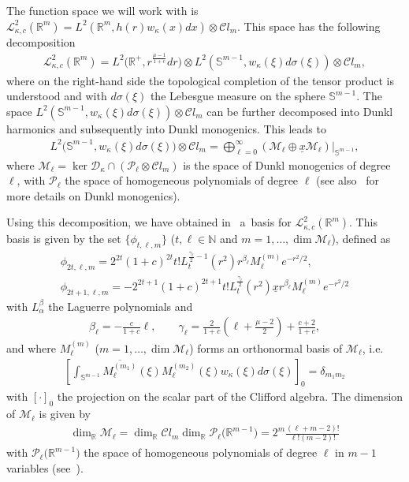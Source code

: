 \documentclass[pdftex]{sigma}
\numberwithin{equation}{section}
\numberwithin{theorem}{section}
\numberwithin{proposition}{section}
\numberwithin{lemma}{section}
\numberwithin{corollary}{section}
\numberwithin{definition}{section}
\numberwithin{example}{section}
\numberwithin{remark}{section}
\numberwithin{note}{section}
\theoremstyle{remark}
\newcommand{\mR}{\mathbb{R}}
\newcommand{\mN}{\mathbb{N}}
\newcommand{\mS}{\mathbb{S}}
\newcommand{\cD}{\mathcal{D}}
\newcommand{\cM}{\mathcal{M}}
\newcommand{\cP}{\mathcal{P}}
\newcommand{\cC}{\mathcal{C}}
\newcommand{\cL}{\mathcal{L}}
\newcommand{\ux}{\underline{x}}
\def\k{{\kappa}}
\begin{document}
The function space we will work with is $\cL^{2}_{\k,c}(\mR^{m})=L^{2}(\mR^{m},h(r)w_{\k}(x)dx)
\otimes\cC l_{m}$.
This space has the following decomposition
\begin{gather*}
\cL^{2}_{\k,c}(\mR^{m})=L^{2}\big(\mR^{+},r^{\frac{\mu-1}{1+c}}dr\big)\otimes
L^{2}(\mS^{m-1},w_{\k}(\xi)d\sigma(\xi))\otimes\cC l_{m},
\end{gather*}
where on the right-hand side the topological completion of the tensor product is understood and
with $d\sigma(\xi)$ the Lebesgue measure on the sphere $\mS^{m-1}$.
The space $L^{2}(\mS^{m-1},w_{\k}(\xi)d\sigma(\xi))\otimes\cC l_{m}$ can be further decomposed
into Dunkl harmonics and subsequently into Dunkl monogenics.
This leads to
\begin{gather*}
L^{2}\big(\mS^{m-1},w_{\k}(\xi)d\sigma(\xi)\big)\otimes\cC l_{m}=\bigoplus_{\ell=0}^{\infty}
\left(\cM_{\ell}\oplus\ux\cM_{\ell}\right)\big|_{\mS^{m-1}},
\end{gather*}
where $\cM_{\ell}=\ker{\cD_{\k}}\cap\left(\cP_{\ell}\otimes\cC l_{m}\right)$ is the space
of Dunkl monogenics of degree $\ell$, with $\cP_{\ell}$ the space of homogeneous polynomials of
degree $\ell$ (see also~\cite{DBGeg} for more details on Dunkl monogenics).

Using this decomposition, we have obtained in~\cite{H12} a~basis for $\cL^{2}_{\k,c}(\mR^{m})$.
This basis is given by the set $\{\phi_{t,\ell,m}\}$ ($t,\ell\in\mN$ and $m=1,\ldots,\dim
\cM_{\ell}$), def\/ined as
\begin{gather*}
\phi_{2t,\ell,m} = 2^{2t} (1+c)^{2t} t! L_{t}^{\frac{\gamma_{\ell}}{2} -1}(r^{2})r^{\beta_{\ell}}
M_{\ell}^{(m)} e^{-r^{2}/2},\\
\phi_{2t+1,\ell,m} = - 2^{2t+1} (1+c)^{2t+1} t! L_{t}^{\frac{\gamma_{\ell}}{2}}(r^{2}) \ux
r^{\beta_{\ell}} M_{\ell}^{(m)} e^{-r^{2}/2}
\end{gather*}
with $L_{\alpha}^{\beta}$ the Laguerre polynomials and
\begin{gather*}
\beta_{\ell} = - \frac{c}{1+c}\ell,\qquad
\gamma_{\ell} = \frac{2}{1+c}\left( \ell + \frac{\mu-2}{2}\right) + \frac{c+2}{1+c},
\end{gather*}
and where $M_{\ell}^{(m)}$ ($m=1,\ldots,\dim\cM_{\ell}$) forms an orthonormal basis of
$\cM_{\ell}$, i.e.
\begin{gather*}
\left[\int_{\mS^{m-1}}\overline{M_{\ell}^{(m_{1})}}(\xi)M_{\ell}^{(m_{2})}(\xi)w_{\k}(\xi)
d\sigma(\xi)\right]_{0}=\delta_{m_{1}m_{2}}
\end{gather*}
with $[\cdot]_0$ the projection on the scalar part of the Clif\/ford algebra.
The dimension of $\cM_{\ell}$ is given by
\begin{gather*}
\dim_{\mR}{\cM_{\ell}} = \dim_{\mR}{\cC l_{m}} \dim_{\mR}{\cP_{\ell}\big(\mR^{m-1}\big)}
=2^{m} \frac{(\ell +m-2)!}{\ell! (m-2)!}
\end{gather*}
with $\cP_{\ell}\big(\mR^{m-1}\big)$ the space of homogeneous polynomials of degree $\ell$ in $m-1$
variables (see~\cite{MR1169463}).
\end{document}
